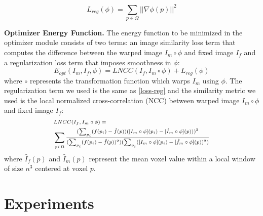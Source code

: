 \documentclass[10pt,twocolumn,letterpaper]{article}
\begin{document}
\begin{equation}
    L_{reg}(\phi)=\sum_{p\in\Omega}||\nabla\phi(p)||^2
    \label{loss-reg}
\end{equation}









\textbf{Optimizer Energy Function.} 
The energy function to be minimized in the optimizer module consists of two terms: an image similarity loss term that computes the difference between the warped image $I_{m }\circ \phi$ and fixed image $I_{f}$ and a regularization loss term that imposes smoothness in $\phi$:
\begin{equation}
    E_{opt}(I_{m},I_{f},\phi)=LNCC(I_{f}, I_{m}\circ\phi)+L_{reg}(\phi)
    \label{energy function}
\end{equation}
where $\circ$ represents the transformation function which warps $I_{m}$ using $\phi$. The regularization term we used is the same as \cref{loss-reg} and the similarity metric we used is the local normalized cross-correlation (NCC) between warped image $I_m\circ\phi$ and fixed image $I_f$:
\begin{equation}
\begin{scriptsize}
\begin{aligned}
    &LNCC(I_f,I_m\circ\phi)=\\
    &\sum_{p\in\Omega}\frac{(\sum_{p_i}(f(p_i)-\hat{f}(p))([I_m\circ\phi](p_i)-[\hat{I}_m\circ\phi](p)))^2}{(\sum_{p_i}(f(p_i)-\hat{f}(p))^2)(\sum_{p_i}([I_m\circ\phi](p_i)-[\hat{f}_m\circ\phi](p))^2)}
\end{aligned}
\end{scriptsize}
\label{NCC-function}
\end{equation}
where $\hat{I}_f(p)$ and $\hat{I}_m(p)$ represent the mean voxel value within a local window of size $n^3$ centered at voxel $p$.



 \section{Experiments}\label{sec:exp}
\end{document}
